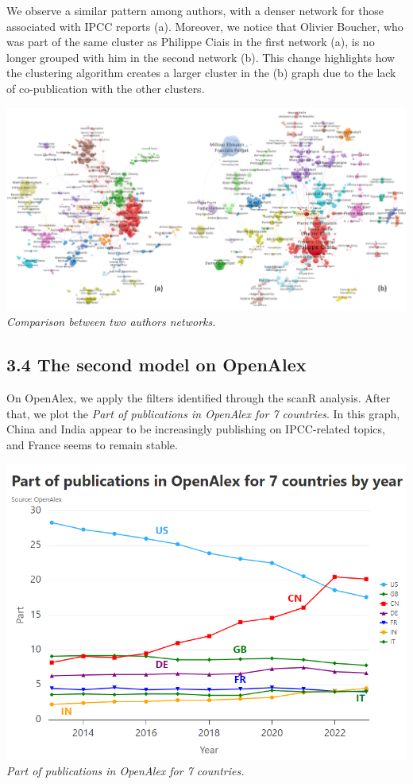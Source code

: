 \documentclass[
]{article}
\begin{document}
We observe a similar pattern among authors, with a denser network for
those associated with IPCC reports (a). Moreover, we notice that Olivier
Boucher, who was part of the same cluster as Philippe Ciais in the first
network (a), is no longer grouped with him in the second network (b).
This change highlights how the clustering algorithm creates a larger
cluster in the (b) graph due to the lack of co-publication with the
other clusters.

\includegraphics{./images/teds_network_authors2.png} \emph{Comparison
between two authors networks.}

\hypertarget{the-second-model-on-openalex}{%
\subsection{3.4 The second model on
OpenAlex}\label{the-second-model-on-openalex}}

On OpenAlex, we apply the filters identified through the scanR analysis.
After that, we plot the \emph{Part of publications in OpenAlex for 7
countries}. In this graph, China and India appear to be increasingly
publishing on IPCC-related topics, and France seems to remain stable.

\includegraphics{./images/teds_OA_part7.png} \emph{Part of publications
in OpenAlex for 7 countries.}
\end{document}
